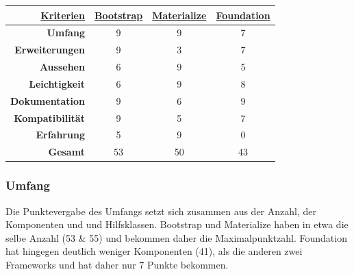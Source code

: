 	\begin{center}
		\begin{table}
			\centering
		\begin{tabular}{rccc}
			\hline
			\multicolumn{1}{|r|}{{\underline{\textbf{Kriterien}}}} & \multicolumn{1}{c|}{{\underline{\textbf{Bootstrap}}}} & \multicolumn{1}{c|}{{ \underline{\textbf{Materialize}}}} & \multicolumn{1}{c|}{{\underline{\textbf{Foundation}}}} \\ \hline
			\multicolumn{1}{|r|}{\textbf{Umfang}}          & \multicolumn{1}{c|}{9}                        & \multicolumn{1}{c|}{9}                          & \multicolumn{1}{c|}{7}                         \\ \hline
			\multicolumn{1}{|r|}{\textbf{Erweiterungen}}   & \multicolumn{1}{c|}{9}                        & \multicolumn{1}{c|}{3}                          & \multicolumn{1}{c|}{7}                         \\ \hline
			\multicolumn{1}{|r|}{\textbf{Aussehen}}        & \multicolumn{1}{c|}{6}                        & \multicolumn{1}{c|}{9}                          & \multicolumn{1}{c|}{5}                         \\ \hline
			\multicolumn{1}{|r|}{\textbf{Leichtigkeit}}    & \multicolumn{1}{c|}{6}                        & \multicolumn{1}{c|}{9}                          & \multicolumn{1}{c|}{8}                         \\ \hline
			\multicolumn{1}{|r|}{\textbf{Dokumentation}}   & \multicolumn{1}{c|}{9}                        & \multicolumn{1}{c|}{6}                          & \multicolumn{1}{c|}{9}                         \\ \hline
			\multicolumn{1}{|r|}{\textbf{Kompatibilität}}  & \multicolumn{1}{c|}{9}                        & \multicolumn{1}{c|}{5}                          & \multicolumn{1}{c|}{7}                         \\ \hline
			\multicolumn{1}{|r|}{\textbf{Erfahrung}}       & \multicolumn{1}{c|}{5}                        & \multicolumn{1}{c|}{9}                          & \multicolumn{1}{c|}{0}                         \\ \hline
			\textbf{Gesamt}                                & 53                                            & 50                                              & 43                                            
		\end{tabular}
	\end{table}
	\end{center}
\subsubsection{Umfang}
\label{chapter:study-frontend-vergleich-umfang}
Die Punktevergabe des Umfangs setzt sich zusammen aus der Anzahl, der Komponenten und und Hilfsklassen. Bootstrap und Materialize haben in etwa die selbe Anzahl (53 \& 55) und bekommen daher die Maximalpunktzahl\cite{bootstrap-docu,WebDocMaterialize,foundation-webdocu}. Foundation hat hingegen deutlich weniger Komponenten (41), als die anderen zwei Frameworks und hat daher nur 7 Punkte bekommen.
